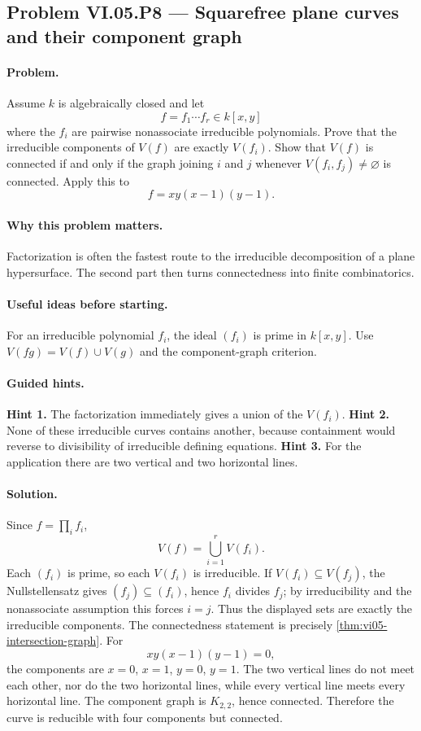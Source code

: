 \subsection*{Problem VI.05.P8 --- Squarefree plane curves and their component graph}
\label{prob:vi05-p8}
\paragraph{Problem.}
Assume \(k\) is algebraically closed and let
\[
f=f_1\cdots f_r\in k[x,y]
\]
where the \(f_i\) are pairwise nonassociate irreducible polynomials.  Prove that the
irreducible components of \(V(f)\) are exactly \(V(f_i)\).  Show that \(V(f)\) is connected
if and only if the graph joining \(i\) and \(j\) whenever \(V(f_i,f_j)\neq\varnothing\) is
connected.  Apply this to
\[
f=xy(x-1)(y-1).
\]
\ifdefined\FullProblemDossiers
\paragraph{Why this problem matters.}
Factorization is often the fastest route to the irreducible decomposition of a plane
hypersurface.  The second part then turns connectedness into finite combinatorics.
\paragraph{Useful ideas before starting.}
For an irreducible polynomial \(f_i\), the ideal \((f_i)\) is prime in \(k[x,y]\).  Use
\(V(fg)=V(f)\cup V(g)\) and the component-graph criterion.
\paragraph{Guided hints.}
\textbf{Hint 1.} The factorization immediately gives a union of the \(V(f_i)\).
\textbf{Hint 2.} None of these irreducible curves contains another, because containment
would reverse to divisibility of irreducible defining equations.
\textbf{Hint 3.} For the application there are two vertical and two horizontal lines.
\paragraph{Solution.}
Since \(f=\prod_i f_i\),
\[
V(f)=\bigcup_{i=1}^r V(f_i).
\]
Each \((f_i)\) is prime, so each \(V(f_i)\) is irreducible.  If
\(V(f_i)\subseteq V(f_j)\), the Nullstellensatz gives
\((f_j)\subseteq(f_i)\), hence \(f_i\) divides \(f_j\); by irreducibility and the
nonassociate assumption this forces \(i=j\).  Thus the displayed sets are exactly the
irreducible components.  The connectedness statement is precisely
\cref{thm:vi05-intersection-graph}.
For
\[
xy(x-1)(y-1)=0,
\]
the components are \(x=0\), \(x=1\), \(y=0\), \(y=1\).  The two vertical lines do not
meet each other, nor do the two horizontal lines, while every vertical line meets every
horizontal line.  The component graph is \(K_{2,2}\), hence connected.  Therefore the
curve is reducible with four components but connected.
